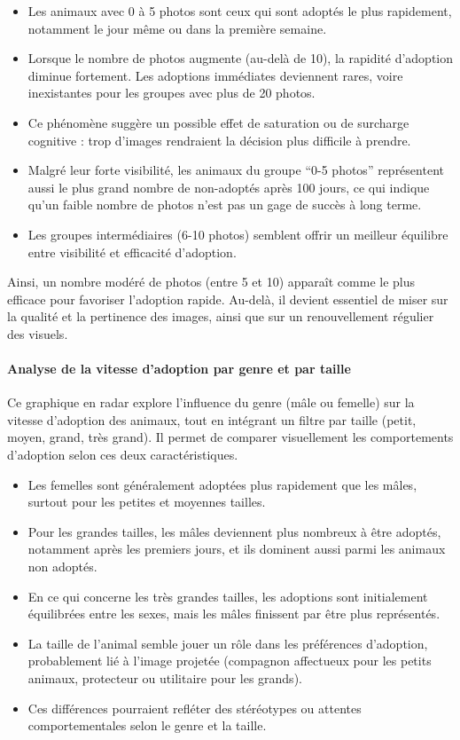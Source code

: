 \documentclass[a4paper,12pt]{article}
\begin{document}
\begin{itemize}
    \item Les animaux avec 0 à 5 photos sont ceux qui sont adoptés le plus rapidement, notamment le jour même ou dans la première semaine.
    \item Lorsque le nombre de photos augmente (au-delà de 10), la rapidité d’adoption diminue fortement. Les adoptions immédiates deviennent rares, voire inexistantes pour les groupes avec plus de 20 photos.
    \item Ce phénomène suggère un possible effet de saturation ou de surcharge cognitive : trop d’images rendraient la décision plus difficile à prendre.
    \item Malgré leur forte visibilité, les animaux du groupe “0-5 photos” représentent aussi le plus grand nombre de non-adoptés après 100 jours, ce qui indique qu’un faible nombre de photos n’est pas un gage de succès à long terme.
    \item Les groupes intermédiaires (6-10 photos) semblent offrir un meilleur équilibre entre visibilité et efficacité d’adoption.
\end{itemize}

Ainsi, un nombre modéré de photos (entre 5 et 10) apparaît comme le plus efficace pour favoriser l’adoption rapide. Au-delà, il devient essentiel de miser sur la qualité et la pertinence des images, ainsi que sur un renouvellement régulier des visuels.

\paragraph{Analyse de la vitesse d’adoption par genre et par taille}

Ce graphique en radar explore l’influence du genre (mâle ou femelle) sur la vitesse d’adoption des animaux, tout en intégrant un filtre par taille (petit, moyen, grand, très grand). Il permet de comparer visuellement les comportements d’adoption selon ces deux caractéristiques.

\begin{itemize}
    \item Les femelles sont généralement adoptées plus rapidement que les mâles, surtout pour les petites et moyennes tailles.
    \item Pour les grandes tailles, les mâles deviennent plus nombreux à être adoptés, notamment après les premiers jours, et ils dominent aussi parmi les animaux non adoptés.
    \item En ce qui concerne les très grandes tailles, les adoptions sont initialement équilibrées entre les sexes, mais les mâles finissent par être plus représentés.
    \item La taille de l’animal semble jouer un rôle dans les préférences d’adoption, probablement lié à l’image projetée (compagnon affectueux pour les petits animaux, protecteur ou utilitaire pour les grands).
    \item Ces différences pourraient refléter des stéréotypes ou attentes comportementales selon le genre et la taille.
\end{itemize}
\end{document}
